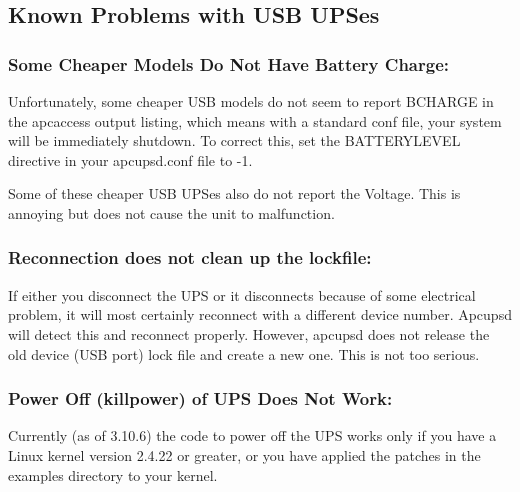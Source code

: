{{{{\label{Known-Problems-with-USB-UPSes}

\subsection*{Known Problems with USB UPSes}

\label{index-Problems_002c-USB-103}

\label{Some-Cheaper-Models-Do-Not-Have-Battery-Charge}

\subsubsection*{Some Cheaper Models Do Not Have Battery Charge:}

\label{index-Problems_002c-no-Battery-charge-104}
Unfortunately, some cheaper USB models do not seem to report BCHARGE in the
apcaccess output listing, which means with a standard conf file, your system
will be immediately shutdown. To correct this, set the BATTERYLEVEL directive
in your apcupsd.conf file to -1.  

Some of these cheaper USB UPSes also do not report the Voltage. This is
annoying but does not cause the unit to malfunction. 

\label{Reconnection-does-not-clean-up-the-lockfile}

\subsubsection*{Reconnection does not clean up the lockfile:}

\label{index-Problems_002c-lock-file-not-cleaned-up-105}
If either you disconnect the UPS or it disconnects because of some electrical
problem, it will most certainly reconnect with a different device number.
Apcupsd will detect this and reconnect properly. However, apcupsd does not
release the old device (USB port) lock file and create a new one. This is not
too serious. 

\label{Power-Off-_005bkillpower_005d-of-UPS-Does-Not-Work}

\subsubsection*{Power Off (killpower) of UPS Does Not Work:}

\label{index-Problems_002c-Power-off-106}
\label{index-Problems_002c-killpower-107}
Currently (as of 3.10.6) the code to power off the UPS works only if you have
a Linux kernel version 2.4.22 or greater, or you have applied the patches in
the examples directory to your kernel. 

}}}}

